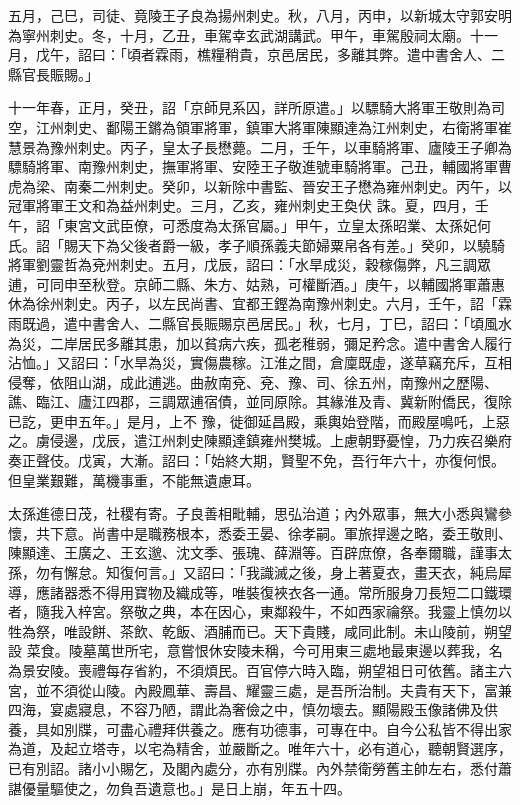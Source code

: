 \begin{pinyinscope}
 五月，己巳，司徒、竟陵王子良為揚州刺史。秋，八月，丙申，以新城太守郭安明為寧州刺史。冬，十月，乙丑，車駕幸玄武湖講武。甲午，車駕殷祠太廟。十一月，戊午，詔曰：「頃者霖雨，樵糧稍貴，京邑居民，多離其弊。遣中書舍人、二縣官長賑賜。」



 十一年春，正月，癸丑，詔「京師見系囚，詳所原遣。」以驃騎大將軍王敬則為司空，江州刺史、鄱陽王鏘為領軍將軍，鎮軍大將軍陳顯達為江州刺史，右衛將軍崔慧景為豫州刺史。丙子，皇太子長懋薨。二月，壬午，以車騎將軍、廬陵王子卿為驃騎將軍、南豫州刺史，撫軍將軍、安陸王子敬進號車騎將軍。己丑，輔國將軍曹虎為梁、南秦二州刺史。癸卯，以新除中書監、晉安王子懋為雍州刺史。丙午，以冠軍將軍王文和為益州刺史。三月，乙亥，雍州刺史王奐伏
 誅。夏，四月，壬午，詔「東宮文武臣僚，可悉度為太孫官屬。」甲午，立皇太孫昭業、太孫妃何氏。詔「賜天下為父後者爵一級，孝子順孫義夫節婦粟帛各有差。」癸卯，以驍騎將軍劉靈哲為兗州刺史。五月，戊辰，詔曰：「水旱成災，穀稼傷弊，凡三調眾逋，可同申至秋登。京師二縣、朱方、姑熟，可權斷酒。」庚午，以輔國將軍蕭惠休為徐州刺史。丙子，以左民尚書、宜都王鏗為南豫州刺史。六月，壬午，詔「霖雨既過，遣中書舍人、二縣官長賑賜京邑居民。」秋，七月，丁巳，詔曰：「頃風水為災，二岸居民多離其患，加以貧病六疾，孤老稚弱，彌足矜念。遣中書舍人履行沾恤。」又詔曰：「水旱為災，實傷農稼。江淮之間，倉廩既虛，遂草竊充斥，互相侵奪，依阻山湖，成此逋逃。曲赦南兗、兗、豫、司、徐五州，南豫州之歷陽、譙、臨江、廬江四郡，三調眾逋宿債，並同原除。其緣淮及青、冀新附僑民，復除已訖，更申五年。」是月，上不
 豫，徙御延昌殿，乘輿始登階，而殿屋鳴吒，上惡之。虜侵邊，戊辰，遣江州刺史陳顯達鎮雍州樊城。上慮朝野憂惶，乃力疾召樂府奏正聲伎。戊寅，大漸。詔曰：「始終大期，賢聖不免，吾行年六十，亦復何恨。但皇業艱難，萬機事重，不能無遺慮耳。



 太孫進德日茂，社稷有寄。子良善相毗輔，思弘治道；內外眾事，無大小悉與鸞參懷，共下意。尚書中是職務根本，悉委王晏、徐孝嗣。軍旅捍邊之略，委王敬則、陳顯達、王廣之、王玄邈、沈文季、張瑰、薛淵等。百辟庶僚，各奉爾職，謹事太孫，勿有懈怠。知復何言。」又詔曰：「我識滅之後，身上著夏衣，畫天衣，純烏犀導，應諸器悉不得用寶物及織成等，唯裝復裌衣各一通。常所服身刀長短二口鐵環者，隨我入梓宮。祭敬之典，本在因心，東鄰殺牛，不如西家禴祭。我靈上慎勿以牲為祭，唯設餅、茶飲、乾飯、酒脯而已。天下貴賤，咸同此制。未山陵前，朔望設
 菜食。陵墓萬世所宅，意嘗恨休安陵未稱，今可用東三處地最東邊以葬我，名為景安陵。喪禮每存省約，不須煩民。百官停六時入臨，朔望祖日可依舊。諸主六宮，並不須從山陵。內殿鳳華、壽昌、耀靈三處，是吾所治制。夫貴有天下，富兼四海，宴處寢息，不容乃陋，謂此為奢儉之中，慎勿壞去。顯陽殿玉像諸佛及供養，具如別牒，可盡心禮拜供養之。應有功德事，可專在中。自今公私皆不得出家為道，及起立塔寺，以宅為精舍，並嚴斷之。唯年六十，必有道心，聽朝賢選序，已有別詔。諸小小賜乞，及閣內處分，亦有別牒。內外禁衛勞舊主帥左右，悉付蕭諶優量驅使之，勿負吾遺意也。」是日上崩，年五十四。




\end{pinyinscope}
